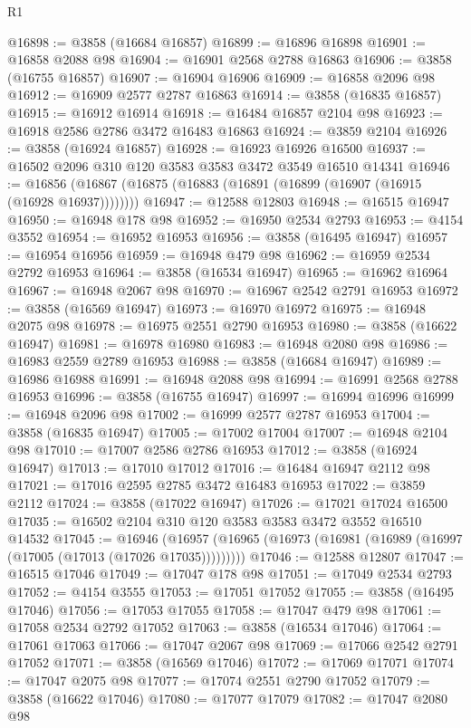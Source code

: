 \begin{lexlean}{R1}
\begin{coremodule}
@16898 := @3858 (@16684 @16857)
@16899 := @16896 @16898
@16901 := @16858 @2088 @98
@16904 := @16901 @2568 @2788 @16863
@16906 := @3858 (@16755 @16857)
@16907 := @16904 @16906
@16909 := @16858 @2096 @98
@16912 := @16909 @2577 @2787 @16863
@16914 := @3858 (@16835 @16857)
@16915 := @16912 @16914
@16918 := @16484 @16857 @2104 @98
@16923 := @16918 @2586 @2786 @3472 @16483 @16863
@16924 := @3859 @2104
@16926 := @3858 (@16924 @16857)
@16928 := @16923 @16926 @16500
@16937 := @16502 @2096 @310 @120 @3583 @3583 @3472 @3549 @16510 @14341
@16946 := @16856 (@16867 (@16875 (@16883 (@16891 (@16899 (@16907 (@16915 (@16928 @16937))))))))
@16947 := @12588 @12803
@16948 := @16515 @16947
@16950 := @16948 @178 @98
@16952 := @16950 @2534 @2793
@16953 := @4154 @3552
@16954 := @16952 @16953
@16956 := @3858 (@16495 @16947)
@16957 := @16954 @16956
@16959 := @16948 @479 @98
@16962 := @16959 @2534 @2792 @16953
@16964 := @3858 (@16534 @16947)
@16965 := @16962 @16964
@16967 := @16948 @2067 @98
@16970 := @16967 @2542 @2791 @16953
@16972 := @3858 (@16569 @16947)
@16973 := @16970 @16972
@16975 := @16948 @2075 @98
@16978 := @16975 @2551 @2790 @16953
@16980 := @3858 (@16622 @16947)
@16981 := @16978 @16980
@16983 := @16948 @2080 @98
@16986 := @16983 @2559 @2789 @16953
@16988 := @3858 (@16684 @16947)
@16989 := @16986 @16988
@16991 := @16948 @2088 @98
@16994 := @16991 @2568 @2788 @16953
@16996 := @3858 (@16755 @16947)
@16997 := @16994 @16996
@16999 := @16948 @2096 @98
@17002 := @16999 @2577 @2787 @16953
@17004 := @3858 (@16835 @16947)
@17005 := @17002 @17004
@17007 := @16948 @2104 @98
@17010 := @17007 @2586 @2786 @16953
@17012 := @3858 (@16924 @16947)
@17013 := @17010 @17012
@17016 := @16484 @16947 @2112 @98
@17021 := @17016 @2595 @2785 @3472 @16483 @16953
@17022 := @3859 @2112
@17024 := @3858 (@17022 @16947)
@17026 := @17021 @17024 @16500
@17035 := @16502 @2104 @310 @120 @3583 @3583 @3472 @3552 @16510 @14532
@17045 := @16946
    (@16957 (@16965 (@16973 (@16981 (@16989 (@16997 (@17005 (@17013 (@17026 @17035)))))))))
@17046 := @12588 @12807
@17047 := @16515 @17046
@17049 := @17047 @178 @98
@17051 := @17049 @2534 @2793
@17052 := @4154 @3555
@17053 := @17051 @17052
@17055 := @3858 (@16495 @17046)
@17056 := @17053 @17055
@17058 := @17047 @479 @98
@17061 := @17058 @2534 @2792 @17052
@17063 := @3858 (@16534 @17046)
@17064 := @17061 @17063
@17066 := @17047 @2067 @98
@17069 := @17066 @2542 @2791 @17052
@17071 := @3858 (@16569 @17046)
@17072 := @17069 @17071
@17074 := @17047 @2075 @98
@17077 := @17074 @2551 @2790 @17052
@17079 := @3858 (@16622 @17046)
@17080 := @17077 @17079
@17082 := @17047 @2080 @98

\end{coremodule}
\end{lexlean}
